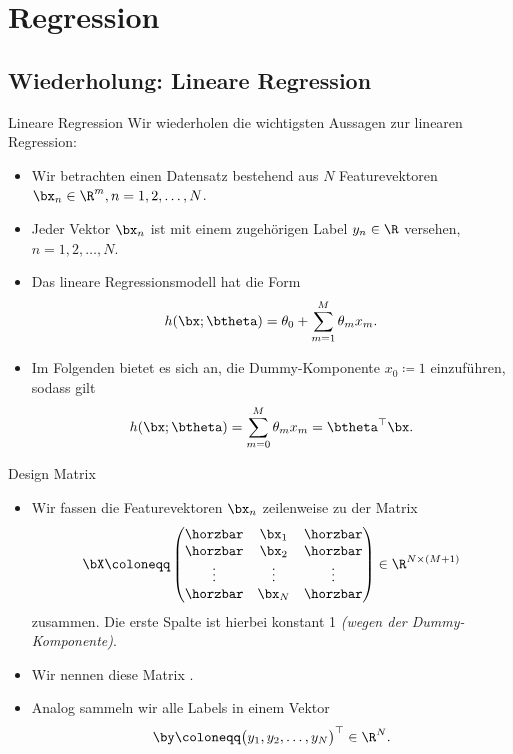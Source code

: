 \section{Regression}

\divider

\subsection{Wiederholung: Lineare Regression}

\begin{frame}{Lineare Regression}{}
	Wir wiederholen die wichtigsten Aussagen zur linearen Regression:

	\begin{itemize}
		\item Wir betrachten einen Datensatz bestehend aus $N$ Featurevektoren $\bx_n \in \R^m, n = 1, 2, \ldots, N$.
		\item Jeder Vektor $\bx_n$ ist mit einem zugehörigen Label $y_n \in \R$ versehen, $n = 1, 2, \ldots, N$.
		\item Das lineare Regressionsmodell hat die Form $$h(\bx; \btheta) = \theta_0 + \sum_{m=1}^M \theta_m x_m.$$
		\item Im Folgenden bietet es sich an, die Dummy-Komponente $x_0 \coloneqq 1$ einzuführen,
			sodass gilt $$h(\bx; \btheta) = \sum_{m=0}^M \theta_m x_m = \btheta^\top \bx.$$
	\end{itemize}
\end{frame}


\begin{frame}{Design Matrix}{}
	\begin{itemize}
		\item Wir fassen die Featurevektoren $\bx_n$ zeilenweise zu der Matrix
		\begin{equation*}
			\bX \coloneqq
			\begin{pmatrix}
				\horzbar 	& \bx_1 	& \horzbar 	\\
				\horzbar 	& \bx_2 	& \horzbar 	\\
				\vdots 	&\vdots 	& \vdots 		\\
				\horzbar 	& \bx_N 	& \horzbar
			\end{pmatrix} \in \R^{N \times (M + 1)}
		\end{equation*}
			zusammen. Die erste Spalte ist hierbei konstant 1 \textit{(wegen der Dummy-Komponente)}.
		\item Wir nennen diese Matrix .
		\item Analog sammeln wir alle Labels in einem Vektor $$\by \coloneqq \bigl( y_1, y_2, \ldots, y_N \bigr)^\top \in \R^N.$$
	\end{itemize}
\end{frame}


